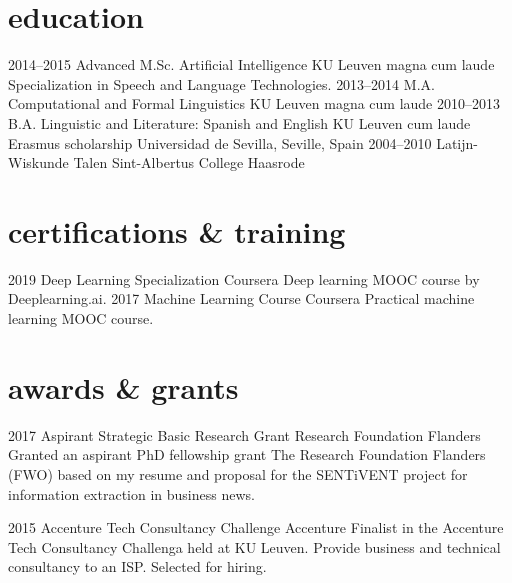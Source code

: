 \documentclass[]{friggeri-cv-a4}
\begin{document}
\section{education}
\begin{entrylist}
  \entry
    {2014–2015}
    {Advanced M.Sc. Artificial Intelligence}
    {KU Leuven}
    {magna cum laude\\
    Specialization in Speech and Language Technologies.
    }
  \entry
    {2013–2014}
    {M.A. Computational and Formal Linguistics}
    {KU Leuven}
    {magna cum laude}
  \entry
    {2010–2013}
    {B.A. Linguistic and Literature: Spanish and English}
    {KU Leuven}
    {cum laude\\Erasmus scholarship Universidad de Sevilla, Seville, Spain}
  \entry
    {2004–2010}
    {Latijn-Wiskunde Talen}
    {Sint-Albertus College Haasrode}
    {}
\end{entrylist}

\section{certifications \& training}
\begin{entrylist}
  \entry
    {2019}
    {Deep Learning Specialization}
    {Coursera}
    {Deep learning MOOC course by Deeplearning.ai.}
  \entry
    {2017}
    {Machine Learning Course}
    {Coursera}
    {Practical machine learning MOOC course.
    }
\end{entrylist}

\section{awards \& grants}
\begin{entrylist}
    \entry
    {2017}
    {Aspirant Strategic Basic Research Grant}
    {Research Foundation Flanders}
    {Granted an aspirant PhD fellowship grant The Research Foundation Flanders (FWO) based on my resume and proposal for the SENTiVENT project for information extraction in business news.}
    
    \entry
    {2015}
    {Accenture Tech Consultancy Challenge}
    {Accenture}
    {Finalist in the Accenture Tech Consultancy Challenga held at KU Leuven. Provide business and technical consultancy to an ISP. Selected for hiring.}
\end{entrylist}
\end{document}
